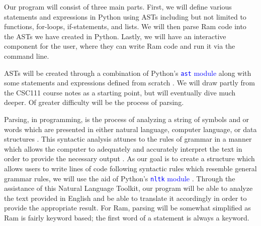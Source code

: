 \documentclass[fontsize=11pt]{article}
\newcommand{\blue}[1]{\textcolor{blue}{#1}}
\begin{document}
Our program will consist of three main parts. First, we will define various statements and expressions in Python using ASTs including but not limited to functions, for-loops, if-statements, and lists. We will then parse Ram code into the ASTs we have created in Python. Lastly, we will have an interactive component for the user, where they can write Ram code and run it via the command line.

ASTs will be created through a combination of Python's \blue{\texttt{ast} module} along with some statements and expressions defined from scratch \cite{pyAST}. We will draw partly from the CSC111 course notes \cite{david} as a starting point, but will eventually dive much deeper. Of greater difficulty will be the process of parsing.

Parsing, in programming, is the process of analyzing a string of symbols and or words which are presented in either natural language, computer language, or data structures \cite{def}. This syntactic analysis attunes to the rules of grammar in a manner which allows the computer to adequately and accurately interpret the text in order to provide the necessary output \cite{def}. As our goal is to create a structure which allows users to write lines of code following syntactic rules which resemble general grammar rules, we will use the aid of Python's \blue{\texttt{nltk} module} \cite{pyNLTK}. Through the assistance of this Natural Language Toolkit, our program will be able to analyze the text provided in English and be able to translate it accordingly in order to provide the appropriate result. 
For Ram, parsing will be somewhat simplified as Ram is fairly keyword based; the first word of a statement is always a keyword.
\end{document}
